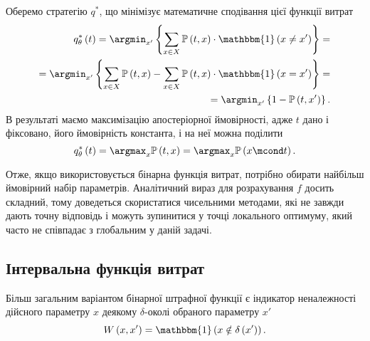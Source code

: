 Оберемо стратегію $q^*$,
що мінімізує математичне сподівання цієї функції витрат
\begin{equation*}
  \begin{split}
    q^*_{\theta}\left( t \right)
    = \argmin_{x'} \left\{
      \sum\limits_{x \in X}
        \mathbb{P}\left( t, x \right)
        \cdot \mathbbm{1} \left( x \neq x' \right)
      \right\} = \\
    = \argmin_{x'} \left\{
      \sum\limits_{x \in X}
        \mathbb{P}\left( t, x \right)
      - \sum\limits_{x \in X}
        \mathbb{P}\left( t, x \right)
        \cdot \mathbbm{1} \left( x = x' \right)
      \right\} = \\
    = \argmin_{x'} \left\{
      1 - \mathbb{P}\left( t, x' \right)
      \right\}.
  \end{split}
\end{equation*}
В результаті маємо максимізацію апостеріорної ймовірності,
адже $t$ дано і фіксовано, його ймовірність константа,
і на неї можна поділити
\begin{equation*}
  q^*_{\theta}\left( t \right)
  = \argmax_x \mathbb{P} \left( t, x \right)
  = \argmax_x \mathbb{P} \left( x \mcond t \right).
\end{equation*}

Отже, якщо використовується бінарна функція витрат,
потрібно обирати найбільш ймовірний набір параметрів.
Аналітичний вираз для розрахування $f$ досить складний,
тому доведеться скористатися чисельними методами,
які не завжди дають точну відповідь
і можуть зупинитися у точці локального оптимуму,
який часто не співпадає з глобальним у даній задачі.

\subsection{Інтервальна функція витрат}

Більш загальним варіантом бінарної штрафної функції є
індикатор неналежності дійсного параметру $x$
деякому $\delta$-околі обраного параметру $x'$
\begin{equation*}
  W \left( x, x' \right)
  = \mathbbm{1} \left( x \notin \delta\left( x' \right) \right).
\end{equation*}

